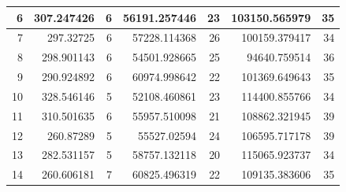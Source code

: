 \begin{table}
\begin{adjustwidth}{}{}
{{\begin{tabular}{|r|r|r|r|r|r|r|}
\hline
6                                          & 307.247426                   & 6                                     & 56191.257446                   & 23                                    & 103150.565979                & 35                                     \\ 
\hline
7                                          & 297.32725                    & 6                                     & 57228.114368                   & 26                                    & 100159.379417                & 34                                     \\ 
\hline
8                                          & 298.901143                   & 6                                     & 54501.928665                   & 25                                    & 94640.759514                 & 36                                     \\ 
\hline
9                                          & 290.924892                   & 6                                     & 60974.998642                   & 22                                    & 101369.649643                & 35                                     \\ 
\hline
10                                         & 328.546146                   & 5                                     & 52108.460861                   & 23                                    & 114400.855766                & 34                                     \\ 
\hline
11                                         & 310.501635                   & 6                                     & 55957.510098                   & 21                                    & 108862.321945                & 39                                     \\ 
\hline
12                                         & 260.87289                    & 5                                     & 55527.02594                    & 24                                    & 106595.717178                & 39                                     \\ 
\hline
13                                         & 282.531157                   & 5                                     & 58757.132118                   & 20                                    & 115065.923737                & 34                                     \\ 
\hline
14                                         & 260.606181                   & 7                                     & 60825.496319                   & 22                                    & 109135.383606                & 35                                     \\ 

\end{tabular}}}
\end{adjustwidth}
\end{table}
